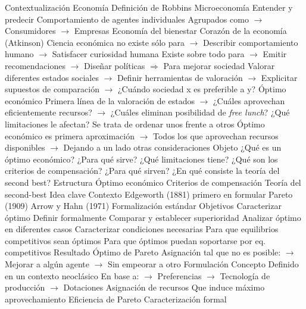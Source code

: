 \documentclass{nuevotema}
\begin{document}
\begin{esquemal}
	\1[] 
		\2 Contextualización
			\3 Economía
				\4 Definición de Robbins
				\4 Microeconomía
				\4[] Entender y predecir
				\4[] Comportamiento de agentes individuales
				\4[] Agrupados como
				\4[] $\to$ Consumidores
				\4[] $\to$ Empresas
			\3 Economía del bienestar
				\4 Corazón de la economía (Atkinson)
				\4[] Ciencia económica no existe sólo para
				\4[] $\to$ Describir comportamiento humano
				\4[] $\to$ Satisfacer curiosidad humana
				\4[] Existe sobre todo para
				\4[] $\to$ Emitir recomendaciones
				\4[] $\to$ Diseñar políticas
				\4[] $\Rightarrow$ Para mejorar sociedad
				\4 Valorar diferentes estados sociales
				\4[] $\to$ Definir herramientas de valoración
				\4[] $\to$ Explicitar supuestos de comparación
				\4[] $\to$ ¿Cuándo sociedad x es preferible a y?
			\3 Óptimo económico
				\4 Primera línea de la valoración de estados
				\4[] $\to$ ¿Cuáles aprovechan eficientemente recursos?
				\4[] $\to$ ¿Cuáles eliminan posibilidad de \textit{free lunch}?
				\4 ¿Qué limitaciones le afectan?
				\4[] Se trata de ordenar unos frente a otros
				\4[] Óptimo económico es primera aproximación
				\4[] $\to$ Todos los que aprovechan recursos disponibles
				\4[] $\to$ Dejando a un lado otras consideraciones
		\2 Objeto
			\3 ¿Qué es un óptimo económico?
			\3 ¿Para qué sirve?
			\3 ¿Qué limitaciones tiene?
			\3 ¿Qué son los criterios de compensación?
			\3 ¿Para qué sirven?
			\3 ¿En qué consiste la teoría del second best?
		\2 Estructura
			\3 Óptimo económico
			\3 Criterios de compensación
			\3 Teoría del second-best
	\1 
		\2 Idea clave
			\3 Contexto
				\4 Edgeworth (1881) primero en formular
				\4 Pareto (1909)
				\4 Arrow y Hahn (1971)
				\4[] Formalización estándar
			\3 Objetivos
				\4 Caracterizar óptimo
				\4 Definir formalmente
				\4 Comparar y establecer superioridad
				\4 Analizar óptimo en diferentes casos
				\4 Caracterizar condiciones necesarias
				\4[] Para que equilibrios competitivos sean óptimos
				\4[] Para que óptimos puedan soportarse por eq. competitivos
			\3 Resultado
				\4 Óptimo de Pareto
				\4[] Asignación tal que no es posible:
				\4[] $\to$ Mejorar a algún agente
				\4[] $\to$ Sin empeorar a otro
		\2 Formulación
			\3 Concepto
				\4 Definido en un contexto neoclásico
				\4[] En base a:
				\4[] $\to$ Preferencias
				\4[] $\to$ Tecnología de producción
				\4[] $\to$ Dotaciones
				\4 Asignación de recursos
				\4[] Que induce máximo aprovechamiento
			\3 Eficiencia de Pareto
				\4 Caracterización formal

\end{esquemal}
\end{document}
